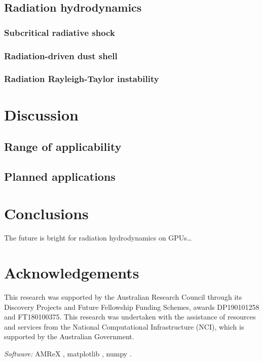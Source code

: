 \documentclass[fleqn,usenatbib]{mnras}
\begin{document}
\subsection{Radiation hydrodynamics}
\subsubsection{Subcritical radiative shock}
\subsubsection{Radiation-driven dust shell}
\subsubsection{Radiation Rayleigh-Taylor instability}

\section{Discussion}
\label{section:discussion}
\subsection{Range of applicability}
\subsection{Planned applications}

\section{Conclusions}
\label{section:conclusions}
The future is bright for radiation hydrodynamics on GPUs\dots

\section*{Acknowledgements}

This research was supported by the Australian Research Council through its Discovery Projects and Future Fellowship Funding Schemes, awards DP190101258 and FT180100375. This research was undertaken with the assistance of resources and services from the National Computational Infrastructure (NCI), which is supported by the Australian Government.

\emph{Software:} AMReX \citep{the_amrex_development_team_2021_5363443},
matplotlib \citep{Hunter:2007},
numpy \citep{harris2020array}.
\end{document}
